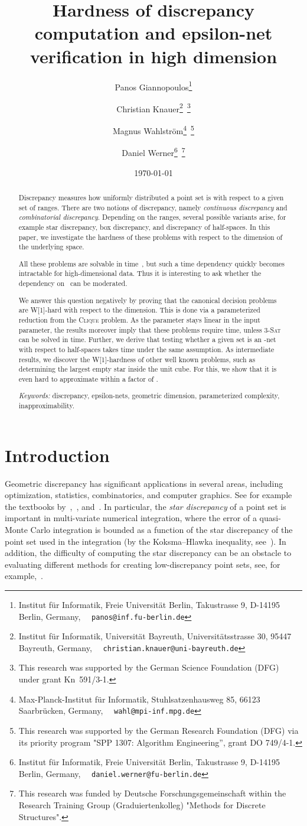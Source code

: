 \documentclass[12pt]{article}
\title{Hardness of discrepancy computation and epsilon-net
  verification in high dimension}
\author{Panos Giannopoulos\thanks{Institut f\"ur Informatik, Freie Universit\"at Berlin, Takustrasse 9, D-14195 Berlin, Germany, \ \  
\texttt{panos@inf.fu-berlin.de}}
\and
Christian Knauer\thanks{Institut f\"ur Informatik,  Universit\"at Bayreuth, Universit{\"a}tsstrasse 30, 
95447 Bayreuth, Germany, \ \ \texttt{christian.knauer@uni-bayreuth.de}}{\ }\footnote{This research was supported by the German Science Foundation (DFG) under grant Kn~591/3-1.}
\and
Magnus Wahlstr{\"o}m\thanks{Max-Planck-Institut f{\"u}r Informatik, Stuhlsatzenhausweg 85,  66123 Saarbr{\"u}cken, Germany, \ \ \texttt{wahl@mpi-inf.mpg.de}}{\ }\footnote{This research was supported by the German Research Foundation (DFG) via its priority program "SPP 1307: Algorithm Engineering'', grant DO 749/4-1.}
\and
Daniel Werner\footnote{Institut f\"ur Informatik, Freie Universit\"at Berlin, Takustrasse 9, D-14195 Berlin, Germany, \ \ \texttt{daniel.werner@fu-berlin.de}}{\ }\footnote{This research was funded by Deutsche Forschungsgemeinschaft within the Research Training Group (Graduiertenkolleg) "Methods for Discrete Structures".}
}
\date{\today}
\begin{document}
\maketitle

\begin{abstract}
Discrepancy measures how uniformly distributed a point set is with respect to a given set of ranges. There are two notions of discrepancy, namely \emph{continuous discrepancy} and \emph{combinatorial discrepancy}. Depending on the ranges, several possible variants arise, for example star discrepancy, box discrepancy, and discrepancy of half-spaces. In this paper, we investigate the hardness of these problems with respect to the dimension  of the underlying space.

All these problems are solvable in time~, but such a
time dependency quickly becomes intractable for high-dimensional data.
Thus it is interesting to ask whether the dependency on~ can be
moderated.  

We answer this question negatively by proving that the canonical decision problems are W[1]-hard with respect to the dimension. This is done via a parameterized reduction from the \textsc{Clique} problem. As the parameter stays linear in the input parameter, the results moreover imply that these problems require  time, unless \textsc{3-Sat} can be solved in  time. Further, we derive that testing whether a given set is an -net with respect to half-spaces takes  time under the same assumption. As intermediate results, we discover the W[1]-hardness of other well known problems, such as determining the largest empty star inside the unit cube. For this, we show that it is even hard to approximate within a factor of .\\ \medskip

\textit{Keywords:} discrepancy, epsilon-nets, geometric dimension, parameterized complexity,
inapproximability. 



\end{abstract}



\section{Introduction}

Geometric discrepancy has significant applications in several areas, including optimization,
statistics, combinatorics, and computer graphics. See for example the textbooks by~\cite{Ma10},~\cite{Ch00}, and~\cite{DT97}. In particular, the \emph{star discrepancy} of a point set is important in
multi-variate numerical integration, 
where the error of a quasi-Monte Carlo integration is bounded as a 
function of the star discrepancy
of the point set used in the integration (by the Koksma--Hlawka 
inequality, see~\cite{niederreiterbook}). 
In addition, the difficulty of computing the star discrepancy can be 
an obstacle to evaluating different methods for creating 
low-discrepancy point sets, see, for example,~\cite{DBLP:journals/jc/DoerrGW10}.
\end{document}
